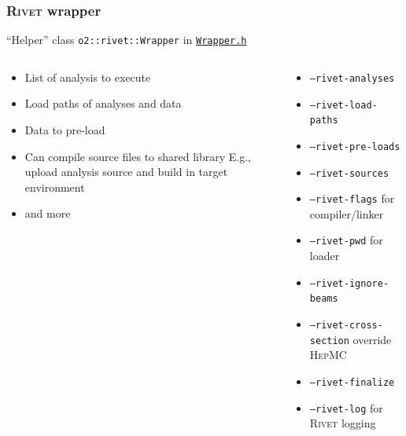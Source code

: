 \documentclass[compress,table,8pt]{beamer}
\newcommand\Rivet{{\scshape Rivet}}
\newcommand\HepMC{{\scshape HepMC}}
\begin{document}
\begin{frame}
  \frametitle{\Rivet{} wrapper}

  ``Helper'' class \texttt{o2::rivet::Wrapper} in
  \href{https://https://github.com/cholmcc/O2Physics/tree/cholmcc_pwgmm_rivet/PWGMM/Rivet/Tasks/Wrapper.h}{\texttt{Wrapper.h}}

  \begin{columns}[onlytextwidth,t]
    \begin{column}{.45\linewidth}
      \begin{itemize}
      \item<+-> List of analysis to execute
      \item<+-> Load paths of analyses and data
      \item<+-> Data to pre-load
      \item<+-> Can compile source files to shared library \newline
        {\footnotesize E.g., upload analysis source and build in
          target environment}
      \item<+-> \textellipsis{} and more
      \end{itemize}
    \end{column}
    \begin{column}{.45\linewidth}
      \begin{itemize}
      \item<1-> \texttt{--rivet-analyses}
      \item<2-> \texttt{--rivet-load-paths}
      \item<3-> \texttt{--rivet-pre-loads}
      \item<4-> \texttt{--rivet-sources}
      \item<5-> \texttt{--rivet-flags} for compiler/linker
      \item<5-> \texttt{--rivet-pwd} for loader
      \item<5-> \texttt{--rivet-ignore-beams}
      \item<5-> \texttt{--rivet-cross-section} override \HepMC{}
      \item<5-> \texttt{--rivet-finalize}
      \item<5-> \texttt{--rivet-log} for \Rivet{} logging
      \end{itemize}
    \end{column}
  \end{columns}
\end{frame}
\end{document}

